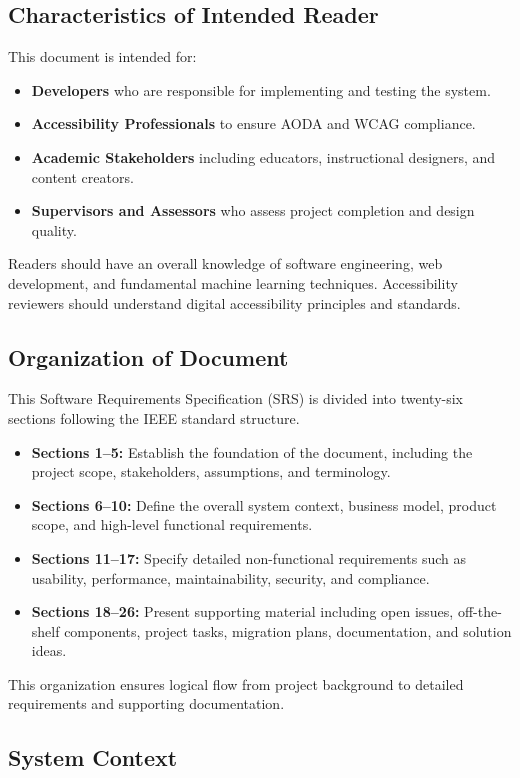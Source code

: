 \documentclass[12pt]{article}
\begin{document}
\subsection{Characteristics of Intended Reader}
This document is intended for:
\begin{itemize}
  \item \textbf{Developers} who are responsible for implementing and
    testing the system.
  \item \textbf{Accessibility Professionals} to ensure AODA and WCAG compliance.
  \item \textbf{Academic Stakeholders} including educators,
    instructional designers, and content creators.
  \item \textbf{Supervisors and Assessors} who assess project
    completion and design quality.
\end{itemize}

\noindent Readers should have an overall knowledge of software engineering, web
development, and fundamental machine learning techniques.
Accessibility reviewers should understand digital accessibility
principles and standards.

\subsection{Organization of Document}
This Software Requirements Specification (SRS) is divided into
twenty-six sections following the IEEE standard structure.
\begin{itemize}
  \item \textbf{Sections 1–5:} Establish the foundation of the
    document, including the project scope, stakeholders, assumptions,
    and terminology.
  \item \textbf{Sections 6–10:} Define the overall system context,
    business model, product scope, and high-level functional requirements.
  \item \textbf{Sections 11–17:} Specify detailed non-functional
    requirements such as usability, performance, maintainability,
    security, and compliance.
  \item \textbf{Sections 18–26:} Present supporting material
    including open issues, off-the-shelf components, project tasks,
    migration plans, documentation, and solution ideas.
\end{itemize}
This organization ensures logical flow from project background to
detailed requirements and supporting documentation.

\subsection{System Context}
\end{document}
